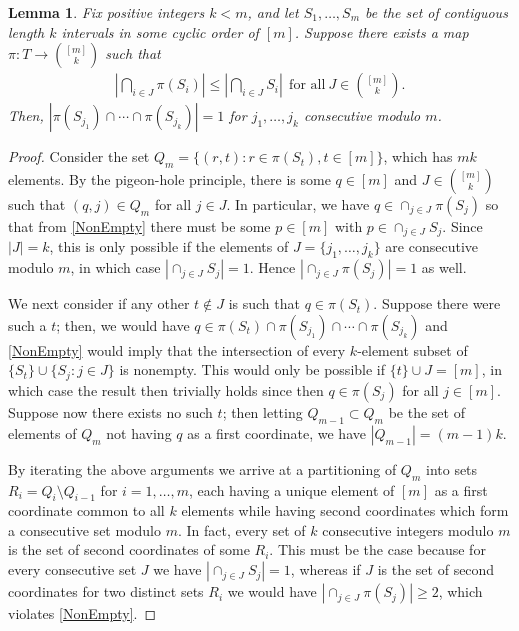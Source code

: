 \documentclass[journal, onecolumn]{IEEEtran}
\newtheorem{lemma}{Lemma}
\begin{document}

\begin{lemma}\label{NonEmptyLemma} Fix positive integers $k < m$, and let $S_1, \ldots, S_m$ be the set of contiguous length $k$ intervals in some cyclic order of $[m]$. Suppose there exists a map $\pi: T \to {[m] \choose k}$ such that
\begin{align}\label{NonEmpty}
|\bigcap_{i \in J} \pi(S_i)| \leq |\bigcap_{i \in J} S_i | \ \ \text{for all} \ J \in {[m] \choose k}.
\end{align}
%
Then, $|\pi(S_{j_1}) \cap \cdots \cap \pi(S_{j_k})| = 1$ for $j_1,\ldots,j_k$ consecutive modulo $m$.
\end{lemma}

\begin{proof} Consider the set $Q_m = \{ (r,t) : r \in \pi(S_t), t \in [m] \}$, which has $mk$ elements. By the pigeon-hole principle, there is some $q \in [m]$ and $J \in {[m] \choose k}$ such that $(q, j) \in Q_m$ for all $j \in J$. In particular, we have $q \in \cap_{j \in J} \pi(S_j)$ so that from \eqref{NonEmpty} there must be some $p \in [m]$ with $p \in \cap_{j \in J} S_j$. Since $|J| = k$, this is only possible if the elements of $J = \{j_1, \ldots, j_k\}$ are consecutive modulo $m$, in which case $|\cap_{j \in J} S_j| = 1$. Hence $|\cap_{j \in J} \pi(S_j)| = 1$ as well.

We next consider if any other $t \notin J$ is such that $q \in \pi(S_t)$. Suppose there were such a $t$; then, we would have $q \in \pi(S_t) \cap \pi(S_{j_1}) \cap \cdots \cap \pi(S_{j_k})$ and \eqref{NonEmpty} would imply that the intersection of every $k$-element subset of $\{S_t\} \cup \{S_j: j \in J\}$ is nonempty. This would only be possible if $\{t\} \cup J = [m]$, in which case the result then trivially holds since then $q \in \pi(S_j)$ for all $j \in [m]$.  Suppose now there exists no such $t$; then letting $Q_{m-1} \subset Q_m$ be the set of elements of $Q_m$ not having $q$ as a first coordinate, we have $|Q_{m-1}| = (m-1)k$. 

By iterating the above arguments we arrive at a partitioning of $Q_m$ into sets $R_i = Q_i \setminus Q_{i-1}$ for $i = 1, \ldots, m$, each having a unique element of $[m]$ as a first coordinate common to all $k$ elements while having second coordinates which form a consecutive set modulo $m$. In fact, every set of $k$ consecutive integers modulo $m$ is the set of second coordinates of some $R_i$. This must be the case because for every consecutive set $J$ we have $|\cap_{j \in J} S_j| = 1$, whereas if $J$ is the set of second coordinates for two distinct sets $R_i$ we would have $|\cap_{j \in J} \pi(S_j)| \geq 2$, which violates \eqref{NonEmpty}. 
\end{proof}
\end{document}

